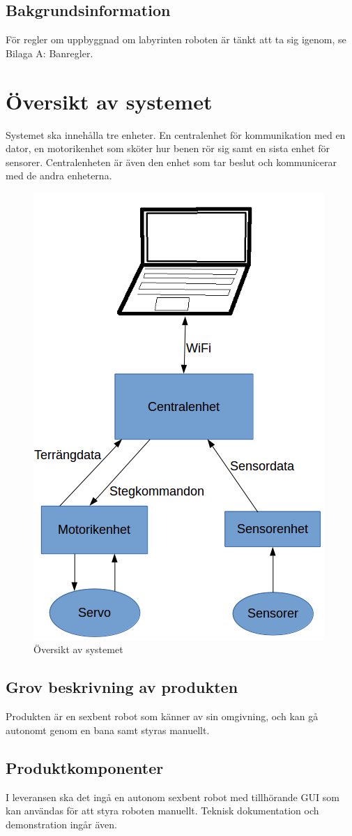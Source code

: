 \documentclass[a4paper,titlepage,12pt]{article}
\begin{document}
	\subsection{Bakgrundsinformation}
	För regler om uppbyggnad om labyrinten roboten är tänkt att ta sig igenom, se
	Bilaga A: Banregler.


  \newpage
	\section{Översikt av systemet}
	Systemet ska innehålla tre enheter. En centralenhet för kommunikation med en dator, en motorikenhet
	som sköter hur benen rör sig samt en sista enhet för sensorer. Centralenheten är även den enhet som
	tar beslut och kommunicerar med de andra enheterna.
	\begin{figure}[h]
		\centering
		\includegraphics[width=0.5\linewidth]{images/overview.png}
		\caption{Översikt av systemet}
		\label{fig:images/overview}
	\end{figure}

	\subsection{Grov beskrivning av produkten}
	Produkten är en sexbent robot som känner av sin omgivning, och kan gå autonomt
	genom en bana samt styras manuellt.
	\subsection{Produktkomponenter}
	I leveransen ska det ingå en autonom sexbent robot med tillhörande GUI som kan användas för att 
	styra roboten manuellt. Teknisk dokumentation och demonstration ingår även. 
\end{document}
